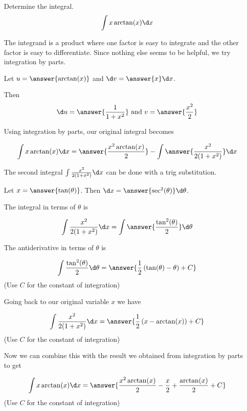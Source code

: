 \documentclass{ximera}
\author{Jason Miller}
\begin{document}
\begin{exercise}
Determine the integral.
\[
\int x\arctan(x) \d x
\]


The integrand is a product where one factor is easy to integrate and the other factor is easy to differentiate. Since nothing else seems to be helpful, we try integration by parts. 

Let $u=\answer{ \arctan(x)}$ and $\d v= \answer{  x } \d x$. 

Then 
\[
  \d u= \answer{ \frac{1}{1+x^{2}}} \text{ and }  v=\answer{ \frac{x^{2}}{2} }
\]

\begin{exercise}

Using integration by parts, our original integral becomes

\[
\int x\arctan(x) \d x=\answer{\frac{x^{2}\arctan(x)}{2}} - \int \answer{\frac{x^{2}}{2(1+x^{2})}} \d x
\]

\begin{exercise}

The second integral $\int \frac{x^{2}}{2(1+x^{2})} \d x$ can be done with a trig substitution. 

Let $x=\answer{ \tan(\theta)}$. Then $\d x=\answer{ \sec^{2}(\theta)} \d \theta$.

The integral in terms of $\theta$ is

\[
\int \frac{x^{2}}{2(1+x^{2})} \d x =\int \answer{ \frac{\tan^{2}(\theta)}{2}} \d \theta
\]

\begin{exercise}
The antiderivative in terms of $\theta$ is

\[
\int \frac{\tan^{2}(\theta)}{2} \d \theta=\answer{\frac{1}{2}\left( \tan(\theta) - \theta \right) + C }
\]
(Use $C$ for the constant of integration)

\begin{exercise}
Going back to our original variable $x$ we have 

\[
\int \frac{x^{2}}{2(1+x^{2})} \d x=\answer{\frac{1}{2}\left( x-\arctan(x) \right) + C }
\]
(Use $C$ for the constant of integration)

\begin{exercise}

Now we can combine this with the result we obtained from integration by parts to get


\[
\int x\arctan(x) \d x=\answer{ \frac{x^{2}\arctan(x)}{2}-\frac{x}{2}+\frac{\arctan(x)}{2} + C}
\]
(Use $C$ for the constant of integration)



\end{exercise}
\end{exercise}

\end{exercise}
\end{exercise}
\end{exercise}
\end{exercise}
\end{document}
